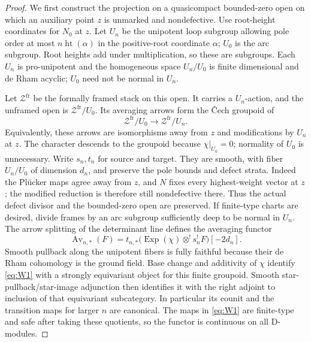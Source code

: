 \documentclass[11pt]{article}
\numberwithin{equation}{section}
\theoremstyle{definition}
\theoremstyle{remark}
\begin{document}
\begin{proof}
We first construct the projection on a quasicompact bounded-zero open on
which an auxiliary point $z$ is unmarked and nondefective. Use root-height
coordinates for $N_0$ at $z$. Let $U_n$ be the unipotent loop subgroup
allowing pole order at most $n\operatorname{ht}(\alpha)$ in the
positive-root coordinate $\alpha$; $U_0$ is the arc subgroup. Root heights
add under multiplication, so these are subgroups. Each $U_n$ is
pro-unipotent and the homogeneous space $U_n/U_0$ is finite dimensional
and de Rham acyclic; $U_0$ need not be normal in $U_n$.

Let $\mathcal Z^{\mathrm{fr}}$ be the formally framed stack on this
open. It carries a $U_n$-action, and the unframed open is
$\mathcal Z^{\mathrm{fr}}/U_0$. Its averaging arrows form the \v Cech
groupoid of
\[
 \mathcal Z^{\mathrm{fr}}/U_0
   \longrightarrow\mathcal Z^{\mathrm{fr}}/U_n.
\]
Equivalently, these arrows are isomorphisms away from $z$ and
modifications by $U_n$ at $z$. The character descends to the groupoid
because $\chi|_{U_0}=0$; normality of $U_0$ is unnecessary. Write
$s_n,t_n$ for source and target. They are smooth, with
fiber $U_n/U_0$ of dimension $d_n$, and preserve the pole bounds and defect
strata. Indeed the Pl\"ucker maps agree away from $z$, and $N$ fixes
every highest-weight vector at $z$; the modified reduction is therefore
still nondefective there. Thus the actual defect divisor and the
bounded-zero open are preserved. If finite-type charts are desired, divide frames by an arc subgroup
sufficiently deep to be normal in $U_n$. The arrow splitting of the
determinant line defines the averaging functor
\begin{equation}\label{eq:W1}
 \operatorname{Av}_{n,*}(F)=
 t_{n,*}\bigl(\operatorname{Exp}(\chi)\otimes^!s_n^!F\bigr)[-2d_n].
\end{equation}
Smooth pullback along the unipotent fibers is fully faithful because
their de Rham cohomology is the ground field. Base change and additivity of
$\chi$ identify \eqref{eq:W1} with a strongly equivariant object for this
finite groupoid. Smooth star-pullback/star-image adjunction then identifies
it with the right adjoint to inclusion of that equivariant subcategory.
In particular its counit and the transition maps for larger $n$ are
canonical. The maps in \eqref{eq:W1} are finite-type and safe after taking
these quotients, so the functor is continuous on all D-modules.


\end{proof}
\end{document}
